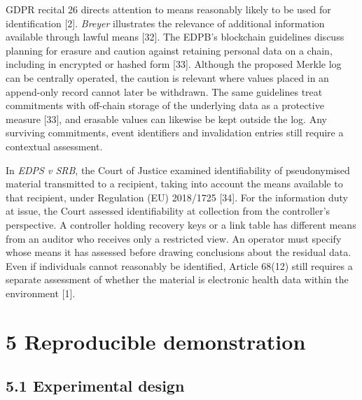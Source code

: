 \documentclass[5p,twocolumn]{elsarticle}
\begin{document}
GDPR recital 26 directs attention to means reasonably likely to be used
for identification {[}2{]}. \emph{Breyer} illustrates the relevance of
additional information available through lawful means {[}32{]}. The
EDPB's blockchain guidelines discuss planning for erasure and caution
against retaining personal data on a chain, including in encrypted or
hashed form {[}33{]}. Although the proposed Merkle log can be centrally
operated, the caution is relevant where values placed in an append-only
record cannot later be withdrawn. The same guidelines treat commitments
with off-chain storage of the underlying data as a protective measure
{[}33{]}, and erasable values can likewise be kept outside the log. Any
surviving commitments, event identifiers and invalidation entries still
require a contextual assessment.

In \emph{EDPS v SRB}, the Court of Justice examined identifiability of
pseudonymised material transmitted to a recipient, taking into account
the means available to that recipient, under Regulation (EU) 2018/1725
{[}34{]}. For the information duty at issue, the Court assessed
identifiability at collection from the controller's perspective. A
controller holding recovery keys or a link table has different means
from an auditor who receives only a restricted view. An operator must
specify whose means it has assessed before drawing conclusions about the
residual data. Even if individuals cannot reasonably be identified,
Article 68(12) still requires a separate assessment of whether the
material is electronic health data within the environment {[}1{]}.

\hypertarget{reproducible-demonstration}{%
\section{5 Reproducible
demonstration}\label{reproducible-demonstration}}

\hypertarget{experimental-design}{%
\subsection{5.1 Experimental design}\label{experimental-design}}
\end{document}
